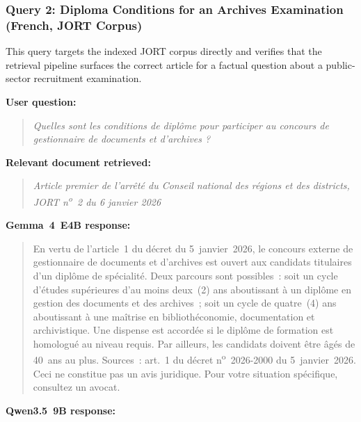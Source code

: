 \subsubsection{Query 2: Diploma Conditions for an Archives Examination (French, JORT Corpus)}
\label{subsubsec:ch4-query2}

This query targets the indexed \ac{JORT} corpus directly and verifies that the retrieval pipeline surfaces the correct article for a factual question about a public-sector recruitment examination.

\vspace{0.5em}

\noindent\textbf{User question:}

\begin{quote}
\textit{Quelles sont les conditions de diplôme pour participer au concours de gestionnaire de documents et d'archives ?}
\end{quote}

\noindent\textbf{Relevant document retrieved:}

\begin{quote}
\textit{Article premier de l'arrêté du Conseil national des régions et des districts, JORT n\textsuperscript{o}~2 du 6 janvier 2026}
\end{quote}

\vspace{0.5em}

\noindent\textbf{Gemma~4~E4B response:}

\begin{quote}
En vertu de l'article~1 du décret du 5~janvier~2026, le concours externe de gestionnaire de documents et d'archives est ouvert aux candidats titulaires d'un diplôme de spécialité. Deux parcours sont possibles~: soit un cycle d'études supérieures d'au moins deux~(2) ans aboutissant à un diplôme en gestion des documents et des archives~; soit un cycle de quatre~(4) ans aboutissant à une maîtrise en bibliothéconomie, documentation et archivistique. Une dispense est accordée si le diplôme de formation est homologué au niveau requis. Par ailleurs, les candidats doivent être âgés de 40~ans au plus.
Sources~: art.~1 du décret n\textsuperscript{o}~2026-2000 du 5~janvier~2026. Ceci ne constitue pas un avis juridique. Pour votre situation spécifique, consultez un avocat.
\end{quote}

\noindent\textbf{Qwen3.5~9B response:}

